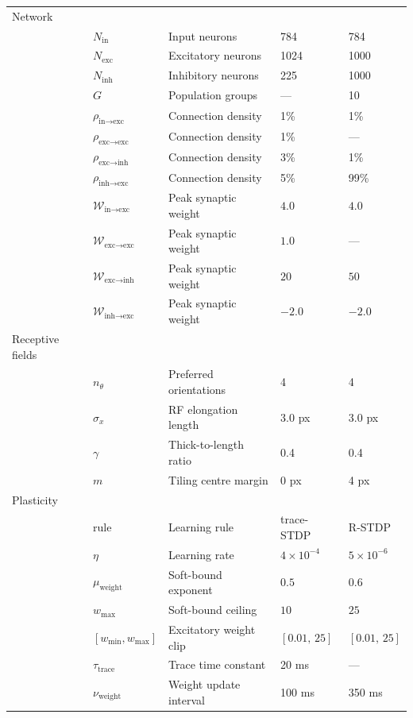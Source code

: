 \begin{longtable}{m{2.4cm}m{1.9cm}m{4.3cm}m{2.1cm}m{2.1cm}}
Network           &&&&\\
  & $N_{\text{in}}$  & Input neurons        & 784 & 784 \\
  & $N_{\text{exc}}$ & Excitatory neurons   & 1024 & 1000 \\
  & $N_{\text{inh}}$ & Inhibitory neurons   & 225 & 1000 \\
  & $G$ & Population groups& --- & 10 \\
  & $\rho_{\text{in}\to\text{exc}}$  & Connection density & 1\% & 1\% \\
  & $\rho_{\text{exc}\to\text{exc}}$ & Connection density & 1\% & --- \\
  & $\rho_{\text{exc}\to\text{inh}}$ & Connection density & 3\% & 1\% \\
  & $\rho_{\text{inh}\to\text{exc}}$ & Connection density & 5\% & 99\% \\
  & $\mathcal{W}_{\text{in}\to\text{exc}}$  & Peak synaptic weight & $4.0$ & $4.0$ \\
  & $\mathcal{W}_{\text{exc}\to\text{exc}}$ & Peak synaptic weight & $1.0$ & --- \\
  & $\mathcal{W}_{\text{exc}\to\text{inh}}$ & Peak synaptic weight & $20$ & $50$ \\
  & $\mathcal{W}_{\text{inh}\to\text{exc}}$ & Peak synaptic weight & $-2.0$ & $-2.0$ \\
Receptive fields  &&&&\\
  & $n_{\theta}$      & Preferred orientations & 4 & 4 \\
  & $\sigma_{x}$      & RF elongation length & 3.0 px & 3.0 px \\
  & $\gamma$          & Thick-to-length ratio & 0.4 & 0.4 \\
  & $m$               & Tiling centre margin & 0 px & 4 px \\
Plasticity        &&&&\\
  & rule              & Learning rule & trace-STDP & R-STDP \\
  & $\eta$            & Learning rate & $4\times10^{-4}$ & $5\times10^{-6}$ \\
  & $\mu_{\text{weight}}$ & Soft-bound exponent & $0.5$ & $0.6$ \\
  & $w_{\max}$        & Soft-bound ceiling & $10$ & $25$ \\
  & $[w_{\min}, w_{\max}]$ & Excitatory weight clip & $[0.01,\,25]$ & $[0.01,\,25]$ \\
  & $\tau_{\text{trace}}$ & Trace time constant & 20 ms & --- \\
  & $\nu_{\text{weight}}$ & Weight update interval & 100 ms & 350 ms \\

\end{longtable}
